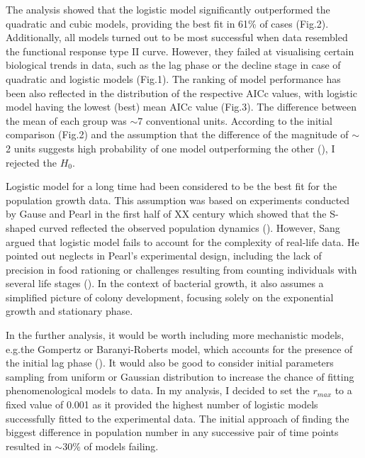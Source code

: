 \documentclass[a4paper,11pt]{article}
\begin{document}
The analysis showed that the logistic model significantly outperformed the quadratic and cubic models, providing the best fit in 61\% of cases (Fig.2). Additionally, all models turned out to be most successful when data resembled the functional response type II curve. However, they failed at visualising certain biological trends in data, such as the lag phase or the decline stage in case of quadratic and logistic models (Fig.1). The ranking of model performance has been also reflected in the distribution of the respective AICc values, with logistic model having the lowest (best) mean AICc value (Fig.3). The difference between the mean of each group was $\sim$7 conventional units. According to the initial comparison (Fig.2) and the assumption that the difference of the magnitude of $\sim$ 2 units suggests high probability of one model outperforming the other (\cite{motulsky2004fitting}), I rejected the $H_{0}$.\par

Logistic model for a long time had been considered to be the best fit for the population growth data. This assumption was based on experiments conducted by Gause and Pearl in the first half of XX century which showed that the S-shaped curved reflected the observed population dynamics (\cite{krebs1985ecology}). However, Sang argued that logistic model fails to account for the complexity of real-life data. He pointed out neglects in Pearl's experimental design, including the lack of precision in food rationing or challenges resulting from counting individuals with several life stages (\cite{krebs1985ecology}). In the context of bacterial growth, it also assumes a simplified picture of colony development, focusing solely on the exponential growth and stationary phase.\par

In the further analysis, it would be worth including more mechanistic models, e.g.the Gompertz or Baranyi-Roberts model, which accounts for the presence of the initial lag phase (\cite{buchanan1997simple}). It would also be good to consider initial parameters sampling from uniform or Gaussian distribution to increase the chance of fitting phenomenological models to data. In my analysis, I decided to set the $r_{max}$ to a fixed value of 0.001 as it provided the highest number of logistic models successfully fitted to the experimental data. The initial approach of finding the biggest difference in population number in any successive pair of time points resulted in $\sim$30\% of models failing.\par
\end{document}
